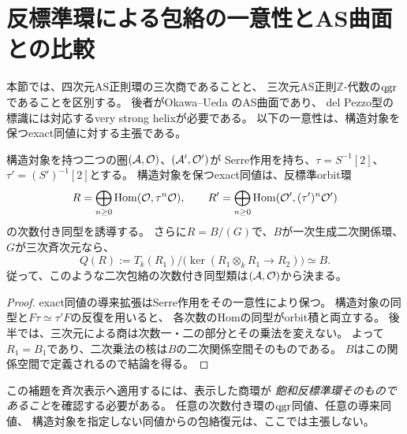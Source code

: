 \section{反標準環による包絡の一意性とAS曲面との比較}
\label{sec:as-surface-scope}

本節では、四次元AS正則環の三次商であることと、
三次元AS正則$\mathbb Z$-代数の$\operatorname{qgr}$であることを区別する。
後者がOkawa--Ueda \cite[Definition~1.1]{OUASSurfaces}のAS曲面であり、
del Pezzo型の標識には対応するvery strong helixが必要である。
以下の一意性は、構造対象を保つexact同値に対する主張である。

\begin{lemma}[飽和反標準環と二次包絡]\label{lem:anticanonical-quadratic-hull}
構造対象を持つ二つの圏$(\mathcal A,\mathcal O)$、$(\mathcal A',\mathcal O')$が
Serre作用を持ち、$\tau=S^{-1}[2]$、$\tau'=(S')^{-1}[2]$とする。
構造対象を保つexact同値は、反標準orbit環
\[
 R=\bigoplus_{n\geq0}\operatorname{Hom}(\mathcal O,\tau^n\mathcal O),\qquad
 R'=\bigoplus_{n\geq0}\operatorname{Hom}(\mathcal O',(\tau')^n\mathcal O')
\]
の次数付き同型を誘導する。
さらに$R=B/(G)$で、$B$が一次生成二次関係環、$G$が三次斉次元なら、
\[
 Q(R):=T_k(R_1)/\bigl(\ker(R_1\otimes_kR_1\longrightarrow R_2)\bigr)
 \simeq B.
\]
従って、このような二次包絡の次数付き同型類は$(\mathcal A,\mathcal O)$から決まる。
\end{lemma}
\begin{proof}
exact同値の導来拡張はSerre作用をその一意性により保つ。
構造対象の同型と$F\tau\simeq\tau'F$の反復を用いると、
各次数のHomの同型がorbit積と両立する。
後半では、三次元による商は次数一・二の部分とその乗法を変えない。
よって$R_1=B_1$であり、二次乗法の核は$B$の二次関係空間そのものである。
$B$はこの関係空間で定義されるので結論を得る。
\end{proof}

この補題を斉次表示へ適用するには、表示した商環が
\emph{飽和反標準環そのものであること}を確認する必要がある。
任意の次数付き環の$\operatorname{qgr}$同値、任意の導来同値、
構造対象を指定しない同値からの包絡復元は、ここでは主張しない。

